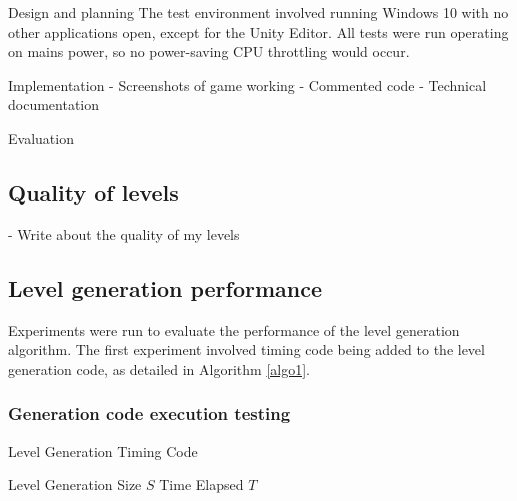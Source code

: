 \documentclass[final]{cmpreport}
\begin{document}
\begin{section}{Design and planning}
The test environment involved running Windows 10 with no other applications open, except for the Unity Editor. All tests were run operating on mains power, so no power-saving CPU throttling would occur. 

\end{section}

\begin{section}{Implementation}
- Screenshots of game working
- Commented code
- Technical documentation

\end{section}

\begin{section}{Evaluation}

\subsection{Quality of levels}
- Write about the quality of my levels

\subsection{Level generation performance}
Experiments were run to evaluate the performance of the level generation algorithm. The first experiment involved timing code being added to the level generation code, as detailed in Algorithm \ref{algo1}.

\subsubsection{Generation code execution testing}

\begin{algorithm}[H]
    \caption{Level Generation Timing Code}
    \label{algo1}
    \begin{algorithmic}[1]
        \Require Level Generation Size ${S}$
        \Ensure Time Elapsed $T$
         
         
         
         
         
             
                 
                 
                 
            \EndIf{}
        \EndFor{}
        \EndFor{}


\end{algorithmic}
\end{algorithm}
\end{section}
\end{document}

